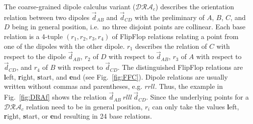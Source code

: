 The coarse-grained dipole calculus variant ($\mathcal{DRA}_{c}$) describes the orientation relation between two dipoles $\vec{d}_{AB}$ and  $\vec{d}_{CD}$ with the preliminary of $A$, $B$, $C$, and $D$ being in general position, i.e.\ no three disjoint points are collinear.
Each base relation is a 4-tuple $(r_1,r_2,r_3,r_4)$ of FlipFlop relations
relating a point from one of the dipoles with the other dipole.
$r_1$ describes the relation of $C$ with respect to the dipole  $\vec{d}_{AB}$, $r_2$ of $D$ with respect to  $\vec{d}_{AB}$, $r_3$ of $A$ with respect to $\vec{d}_{CD}$, and $r_4$ of $B$ with respect to $\vec{d}_{CD}$. The distinguished
FlipFlop relations are \textbf{l}eft, \textbf{r}ight, \textbf{s}tart,
and \textbf{e}nd (see Fig.~\ref{fig:FFC}). Dipole relations are usually written without commas and parentheses, e.g. $rrll$. Thus, the example in Fig.~\ref{fig:DRAf} shows the relation $\vec{d}_{AB}~rlll~\vec{d}_{CD}$.
Since the underlying points for a $\mathcal{DRA}_{c}$ relation need to be in
general position, $r_i$ can only take the values \textbf{l}eft, \textbf{r}ight, \textbf{s}tart, or \textbf{e}nd resulting in 24 base relations.


%
%

